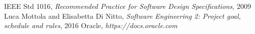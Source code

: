 	IEEE Std 1016, \emph{Recommended Practice for Software Design Specifications}, 2009
	Luca Mottola and Elisabetta Di Nitto, \emph{Software Engineering 2: Project goal, schedule and rules}, 2016
	Oracle, \emph{https://docs.oracle.com}
